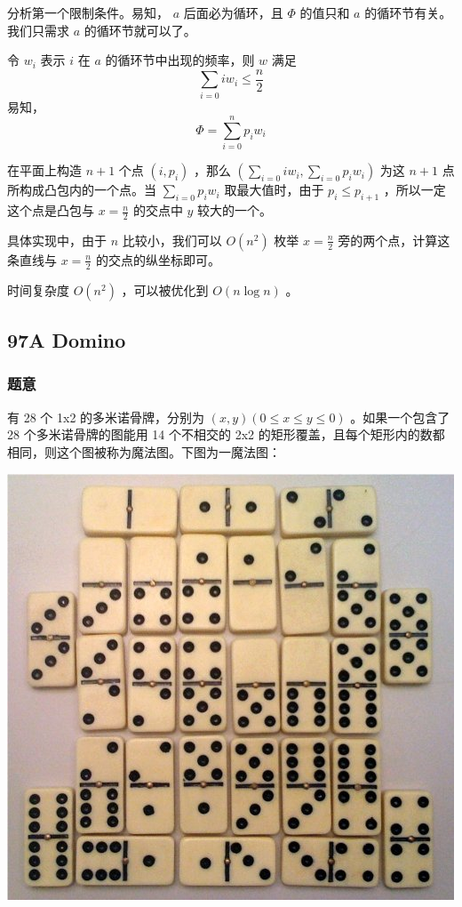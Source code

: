 \documentclass[11pt]{article}
\begin{document}
    分析第一个限制条件。易知， $a$ 后面必为循环，且 $\Phi$ 的值只和 $a$ 的循环节有关。我们只需求 $a$ 的循环节就可以了。

    令 $w_i$ 表示 $i$ 在 $a$ 的循环节中出现的频率，则 $w$ 满足
    $$\sum_{i = 0} i w_i \leq \frac{n}{2}$$
    易知，
    $$\Phi = \sum_{i = 0}^n p_i w_i$$

    在平面上构造 $n + 1$ 个点 $(i, p_i)$ ，那么 $(\sum_{i = 0} i w_i, \sum_{i = 0} p_i w_i)$ 为这 $n + 1$ 点所构成凸包内的一个点。当 $\sum_{i = 0} p_i w_i$ 取最大值时，由于 $p_i \leq p_{i + 1}$ ，所以一定这个点是凸包与 $x = \frac{n}{2}$ 的交点中 $y$ 较大的一个。

    具体实现中，由于 $n$ 比较小，我们可以 $O(n^2)$ 枚举 $x = \frac{n}{2}$ 旁的两个点，计算这条直线与 $x = \frac{n}{2}$ 的交点的纵坐标即可。

    时间复杂度 $O(n^2)$ ，可以被优化到 $O(n \log n)$ 。
\subsection{97A   Domino}
\label{sec-7-2}
\subsubsection{题意}
\label{sec-7-2-1}

    有 28 个 1x2 的多米诺骨牌，分别为 $(x, y) (0 \leq x \leq y \leq 0)$ 。如果一个包含了 28 个多米诺骨牌的图能用 14 个不相交的 2x2 的矩形覆盖，且每个矩形内的数都相同，则这个图被称为魔法图。下图为一魔法图：

\begin{center}\includegraphics[scale = 0.4]{pic/97A.png}\end{center}
\end{document}
